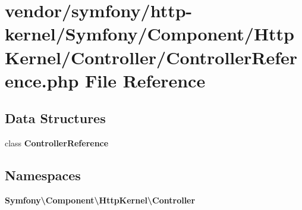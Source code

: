 \section{vendor/symfony/http-\/kernel/\+Symfony/\+Component/\+Http\+Kernel/\+Controller/\+Controller\+Reference.php File Reference}
\label{_controller_reference_8php}
\subsection*{Data Structures}
\begin{DoxyCompactItemize}
\item 
class {\bf Controller\+Reference}
\end{DoxyCompactItemize}
\subsection*{Namespaces}
\begin{DoxyCompactItemize}
\item 
 {\bf Symfony\textbackslash{}\+Component\textbackslash{}\+Http\+Kernel\textbackslash{}\+Controller}
\end{DoxyCompactItemize}
